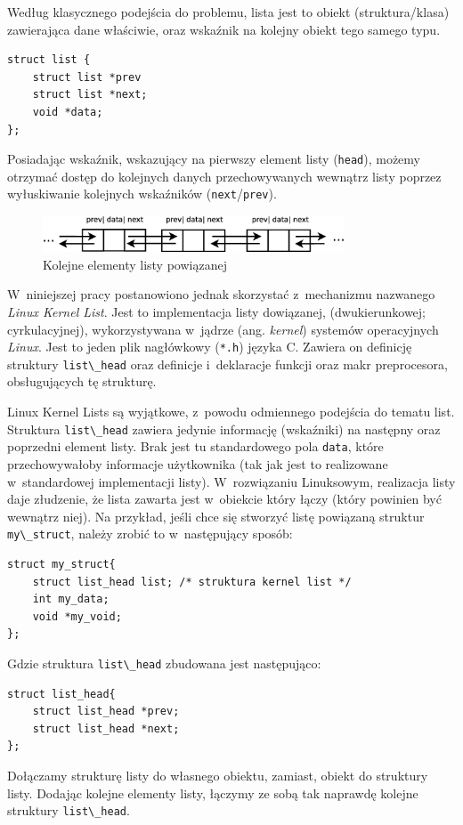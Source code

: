 \documentclass[a4paper,12pt,polish,twoside,openright]{thesis}
\newcommand\code[1]{\lstinline[style=line]{#1}}
\begin{document}
Według klasycznego podejścia do problemu, lista jest to obiekt (struktura/klasa) zawierająca dane właściwie, oraz wskaźnik na kolejny obiekt tego samego typu.\cite{algo}
\begin{lstlisting}[style=code,caption=Idea listy powiązanej w~C]
struct list {
	struct list *prev
	struct list *next;
	void *data;
};
\end{lstlisting}
Posiadając wskaźnik, wskazujący na pierwszy element listy (\code{head}), możemy otrzymać dostęp do kolejnych danych przechowywanych wewnątrz listy poprzez wyłuskiwanie kolejnych wskaźników (\code{next}/\code{prev}).

\begin{figure}[htb]
	\begin{center}
		\includegraphics[width=0.80\textwidth]{gfx/linkedlist.eps}
		\caption{Kolejne elementy listy powiązanej}
	\end{center}
\end{figure}

W~niniejszej pracy postanowiono jednak skorzystać z~mechanizmu nazwanego \emph{Linux Kernel List}.
Jest to implementacja listy dowiązanej, (dwukierunkowej; cyrkulacyjnej), wykorzystywana w~jądrze (ang. \emph{kernel}) systemów operacyjnych \emph{Linux}\cite{lkl}.
Jest to jeden plik nagłówkowy (\code{*.h}) języka C.
Zawiera on definicję struktury \code{list\_head} oraz definicje i~deklaracje funkcji oraz makr preprocesora, obsługujących tę strukturę.

Linux Kernel Lists są wyjątkowe, z~powodu odmiennego podejścia do tematu list.
Struktura \code{list\_head} zawiera jedynie informację (wskaźniki) na następny oraz poprzedni element listy.
Brak jest tu standardowego pola \code{data}, które przechowywałoby informacje użytkownika (tak jak jest to realizowane w~standardowej implementacji listy).
W~rozwiązaniu Linuksowym, realizacja listy daje złudzenie, że lista zawarta jest w~obiekcie który łączy (który powinien być wewnątrz niej).
Na przykład, jeśli chce się stworzyć listę powiązaną struktur \code{my\_struct}, należy zrobić to w~następujący sposób:
\begin{lstlisting}[style=code,caption=Przykład tworzenia listy powiązanej za pomocą Kernel Lined List]
struct my_struct{
	struct list_head list; /* struktura kernel list */
	int my_data;
	void *my_void;
};
\end{lstlisting}
Gdzie struktura \code{list\_head} zbudowana jest następująco:
\begin{lstlisting}[style=code]
struct list_head{
	struct list_head *prev;
	struct list_head *next;
};
\end{lstlisting}
Dołączamy strukturę listy do własnego obiektu, zamiast, obiekt do struktury listy.
Dodając kolejne elementy listy, łączymy ze sobą tak naprawdę kolejne struktury \code{list\_head}.
\end{document}
